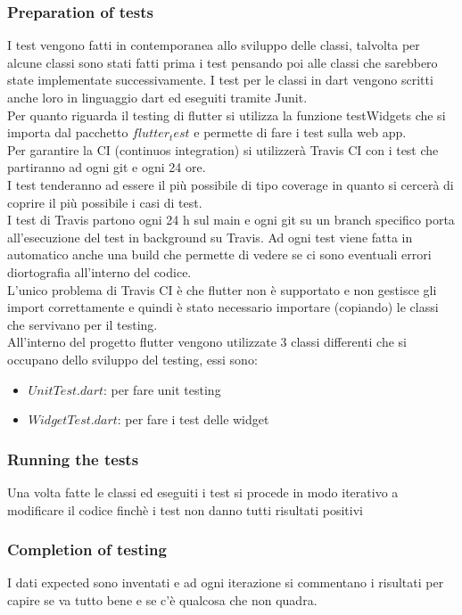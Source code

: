 \documentclass{article}
\begin{document}
\begin{itemize}
\subsubsection{Preparation of tests}
I test vengono fatti in contemporanea allo sviluppo delle classi, talvolta per alcune classi
sono stati fatti prima i test pensando poi alle classi che sarebbero state implementate successivamente.
I test per le classi in dart vengono scritti anche loro in linguaggio dart ed eseguiti tramite Junit.
\\Per quanto riguarda il testing di flutter si utilizza la funzione testWidgets che si importa 
dal pacchetto $flutter_test$ e permette di fare i test sulla web app.
\\Per garantire la CI (continuos integration) si utilizzerà Travis CI con i test che partiranno ad
ogni git e ogni 24 ore.
\\I test tenderanno ad essere il più possibile di tipo coverage in quanto si cercerà di coprire 
il più possibile i casi di test.
\\I test di Travis partono ogni 24 h sul main e ogni git su un branch specifico porta all'esecuzione 
del test in background su Travis. Ad ogni test viene fatta in automatico anche una build che permette
di vedere se ci sono eventuali errori diortografia all'interno del codice.
\\L'unico problema di Travis CI è che flutter non è supportato e non gestisce gli import correttamente e quindi è stato necessario importare (copiando) le classi che 
servivano per il testing.
\\All'interno del progetto flutter vengono utilizzate 3 classi differenti che si occupano dello 
sviluppo del testing, essi sono:
\begin{itemize}
    \item $UnitTest.dart$: per fare unit testing
    \item $WidgetTest.dart$: per fare i test delle widget
\end{itemize}

\subsubsection{Running the tests}
Una volta fatte le classi ed eseguiti i test si procede in modo iterativo a modificare il codice
finchè i test non danno tutti risultati positivi

\subsubsection{Completion of testing}
I dati expected sono inventati e ad ogni iterazione si commentano i risultati per capire 
se va tutto bene e se c'è qualcosa che non quadra.


\end{itemize}
\end{document}
